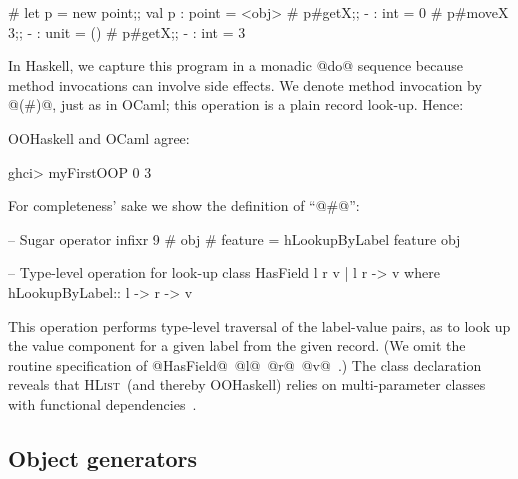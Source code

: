\documentclass{jfp}
\newcommand{\HList}{\textsc{HList}}
\begin{document}
\begin{code}
 # let p = new point;;
 val p : point = <obj>
 # p#getX;;
 - : int = 0
 # p#moveX 3;;
 - : unit = ()
 # p#getX;;
 - : int = 3
\end{code}

In Haskell, we capture this program in a monadic @do@ sequence because
method invocations can involve side effects. We denote method
invocation by @(#)@, just as in OCaml; this operation is a plain
record look-up. Hence:


OOHaskell and OCaml agree:

\begin{code}
 ghci> myFirstOOP
 0
 3
\end{code}

For completeness' sake we show the definition of ``@#@'':

\begin{code}
 -- Sugar operator
 infixr 9 #
 obj # feature = hLookupByLabel feature obj
\end{code}

\begin{code}
 -- Type-level operation for look-up
 class HasField l r v | l r -> v
  where
   hLookupByLabel:: l -> r -> v
\end{code}

This operation performs type-level traversal of the label-value pairs,
as to look up the value component for a given label from the given
record. (We omit the routine specification of
@HasField@~@l@~@r@~@v@~\cite{HLIST-HW04}.) The class declaration
reveals that \HList\ (and thereby OOHaskell) relies on multi-parameter
classes~\cite{CHO92,MPJ92,MPJ95,PJJM97} with functional
dependencies~\cite{MPJ00,DPJSS04}.






\subsection{Object generators}
\end{document}
